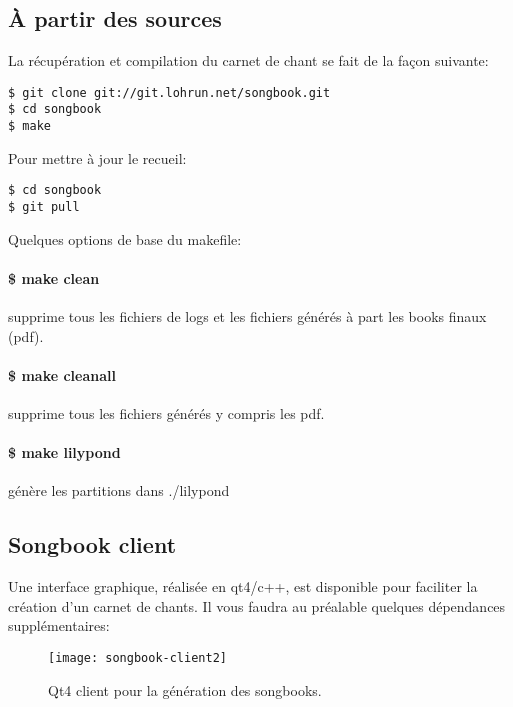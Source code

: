 \documentclass[a4paper]{article}
\begin{document}
\subsection{À partir des sources}

La récupération et compilation du carnet de chant se fait de la façon suivante:

\begin{verbatim}
$ git clone git://git.lohrun.net/songbook.git
$ cd songbook
$ make
\end{verbatim}

Pour mettre à jour le recueil:

\begin{verbatim}
$ cd songbook
$ git pull
\end{verbatim}

Quelques options de base du makefile:

\paragraph{\$ make clean} 
supprime tous les fichiers de logs et les fichiers générés à part les
books finaux (pdf).

\paragraph{\$ make cleanall}
supprime tous les fichiers générés y compris les pdf.

\paragraph{\$ make lilypond}
génère les partitions dans ./lilypond

\subsection{Songbook client}

Une interface graphique, réalisée en qt4/c++, est disponible pour
faciliter la création d'un carnet de chants. Il vous faudra au
préalable quelques dépendances supplémentaires:

\begin{figure}
  \centering
  \texttt{[image: songbook-client2]}
  \caption{Qt4 client pour la génération des songbooks.}
  \label{fig:sb-client}
\end{figure}
\end{document}
